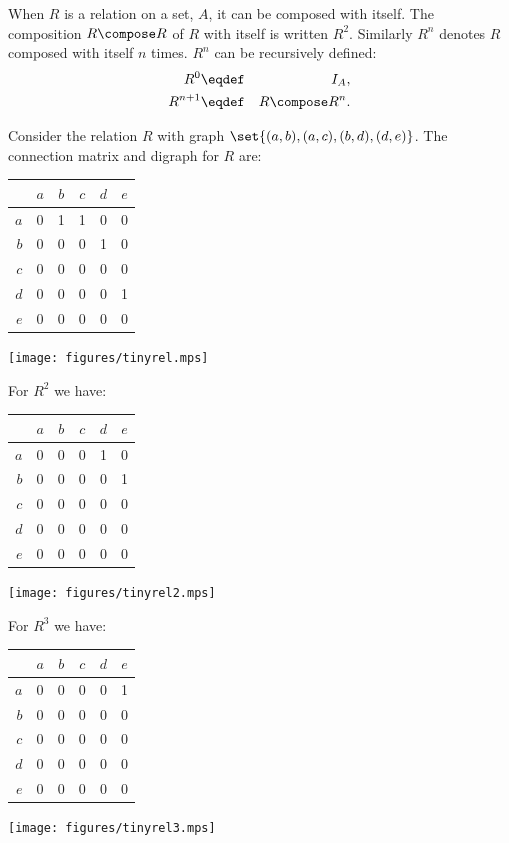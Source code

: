 When $R$ is a relation on a set, $A$, it can be composed with itself.  The
composition $R \compose R$ of $R$ with itself is written $R^2$.  Similarly
$R^n$ denotes $R$ composed with itself $n$ times.  $R^n$ can be
recursively defined:
\begin{eqnarray*}
R^0 & \eqdef & I_A,\\
R^{n+1} & \eqdef & R \compose R^{n}.
\end{eqnarray*}

\begin{example}
\begin{samepage}
Consider the relation $R$ with graph $\set{(a,b), (a,c), (b,d), (d,e)}$.
The connection matrix and digraph for $R$ are:
    \begin{center}
      \begin{tabular}[b]{r|ccccc}
            &$a$&$b$&$c$&$d$&$e$ \\
        \hline
        $a$ & 0 & 1 & 1 & 0 & 0  \\
        $b$ & 0 & 0 & 0 & 1 & 0  \\
        $c$ & 0 & 0 & 0 & 0 & 0  \\
        $d$ & 0 & 0 & 0 & 0 & 1  \\
        $e$ & 0 & 0 & 0 & 0 & 0
      \end{tabular}
      \hfil
      \texttt{[image: figures/tinyrel.mps]}
    \end{center}    
  \end{samepage}
  \begin{samepage}
   For $R^2$ we have:
    \begin{center}
      \begin{tabular}[b]{r|ccccc}
            &$a$&$b$&$c$&$d$&$e$ \\
        \hline
        $a$ & 0 & 0 & 0 & 1 & 0  \\
        $b$ & 0 & 0 & 0 & 0 & 1  \\
        $c$ & 0 & 0 & 0 & 0 & 0  \\
        $d$ & 0 & 0 & 0 & 0 & 0  \\
        $e$ & 0 & 0 & 0 & 0 & 0
      \end{tabular}
      \hfil
      \texttt{[image: figures/tinyrel2.mps]}
    \end{center}
  \end{samepage}
  \begin{samepage}
   For $R^3$ we have:
    \begin{center}
      \begin{tabular}[b]{r|ccccc}
            &$a$&$b$&$c$&$d$&$e$ \\
        \hline
        $a$ & 0 & 0 & 0 & 0 & 1  \\
        $b$ & 0 & 0 & 0 & 0 & 0  \\
        $c$ & 0 & 0 & 0 & 0 & 0  \\
        $d$ & 0 & 0 & 0 & 0 & 0  \\
        $e$ & 0 & 0 & 0 & 0 & 0
      \end{tabular}
      \hfil
      \texttt{[image: figures/tinyrel3.mps]}
    \end{center}
  \end{samepage}
\end{example}

